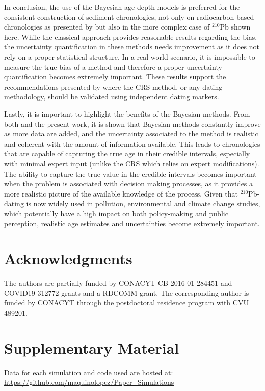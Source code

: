 \documentclass [10pt] {article}
\begin{document}
In conclusion, the use of the Bayesian age-depth models is preferred for the consistent construction of sediment chronologies, not only on radiocarbon-based chronologies as presented by \citet{Blaauw2018} but also in the more complex case of $^{210}$Pb shown here.
While the classical approach provides reasonable results regarding the bias, the uncertainty quantification in these methods needs improvement as it does not rely on a proper statistical structure. 
In a real-world scenario, it is impossible to measure the true bias of a method and therefore a proper uncertainty quantification becomes extremely important.
These results support the recommendations presented by \citet{Smith2001,Barsanti2020} where the CRS method, or any dating methodology, should be validated using independent dating markers. 

Lastly, it is important to highlight the benefits of the Bayesian methods.
From both \citet{Blaauw2018} and the present work, it is shown that Bayesian methods constantly improve as more data are added, and the uncertainty associated to the method is realistic and coherent with the amount of information available. 
This leads to chronologies that are capable of capturing the true age in their credible intervals, especially with minimal expert input (unlike the CRS which relies on expert modifications). 
The ability to capture the true value in the credible intervals becomes important when the problem is associated with decision making processes, as it provides a more realistic picture of the available knowledge of the process. 
Given that $^{210}$Pb-dating is now widely used in pollution, environmental and climate change studies, which potentially have a high impact on both policy-making and public perception, realistic age estimates and uncertainties become extremely important.

\section{Acknowledgments}

The authors are partially funded by CONACYT CB-2016-01-284451 and COVID19 312772 grants and a RDCOMM grant.
The corresponding author is funded by CONACYT through the postdoctoral residence program with CVU  489201.




\newpage


\section{Supplementary Material}
\label{sec:supp_mat}
Data for each simulation and code used are hosted at: \url{https://github.com/maquinolopez/Paper_Simulations}
\end{document}
